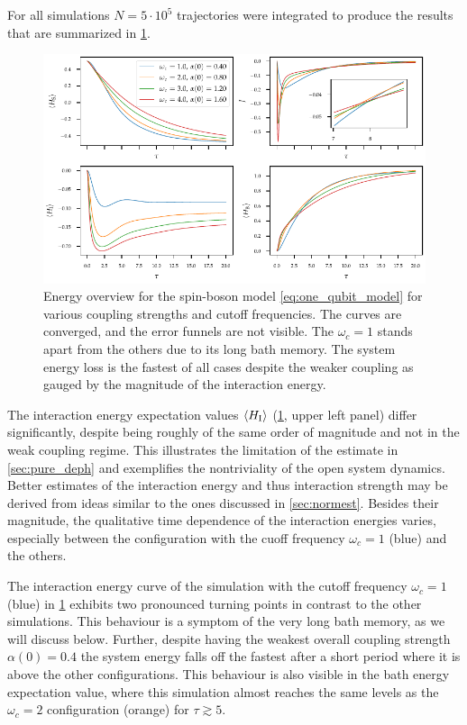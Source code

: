 For all simulations \(N=5\cdot 10^{5}\) trajectories were integrated
to produce the results that are summarized in
\cref{fig:omega_systematics_system}.
\begin{figure}[htp]
  \centering
  \includegraphics{figs/one_bath_syst/omega_energy_overview}
  \caption{\label{fig:omega_systematics_system} Energy overview for
    the spin-boson model \cref{eq:one_qubit_model} for various
    coupling strengths and cutoff frequencies. The curves are
    converged, and the error funnels are not visible. The \(ω_{c}=1\)
    stands apart from the others due to its long bath memory. The
    system energy loss is the fastest of all cases despite the weaker
    coupling as gauged by the magnitude of the interaction energy.}
\end{figure}
The interaction energy expectation values \(\ev{H_{\inter}}\)
(\cref{fig:omega_systematics_system}, upper left panel) differ
significantly, despite being roughly of the same order of magnitude
and not in the weak coupling regime. This illustrates the limitation
of the estimate in \cref{sec:pure_deph} and exemplifies the
nontriviality of the open system dynamics. Better estimates of the
interaction energy and thus interaction strength may be derived from
ideas similar to the ones discussed in \cref{sec:normest}.  Besides
their magnitude, the qualitative time dependence of the interaction
energies varies, especially between the configuration with the cuoff
frequency \(ω_c=1\) (blue) and the others.

The interaction energy curve of the simulation with the cutoff
frequency \(ω_c=1\) (blue) in \cref{fig:omega_systematics_system}
exhibits two pronounced turning points in contrast to the other
simulations. This behaviour is a symptom of the very long bath memory,
as we will discuss below. Further, despite having the weakest overall
coupling strength \(α(0)=0.4\) the system energy falls off the fastest
after a short period where it is above the other configurations. This
behaviour is also visible in the bath energy expectation value, where
this simulation almost reaches the same levels as the \(ω_c=2\)
configuration (orange) for \(τ\gtrsim 5\).

